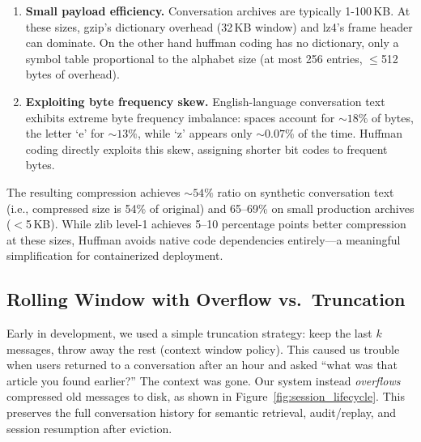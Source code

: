 \documentclass[conference]{IEEEtran}
\begin{document}
\begin{enumerate}
\item \textbf{Small payload efficiency.} Conversation archives are typically 1-100\,KB. At these sizes, gzip's dictionary overhead (32\,KB window) and lz4's frame header can dominate. On the other hand huffman coding has no dictionary, only a symbol table proportional to the alphabet size (at most 256 entries, $\leq$512 bytes of overhead).

\item \textbf{Exploiting byte frequency skew.} English-language conversation text exhibits extreme byte frequency imbalance: spaces account for ${\sim}18\%$ of bytes, the letter `e' for ${\sim}13\%$, while `z' appears only ${\sim}0.07\%$ of the time. Huffman coding directly exploits this skew, assigning shorter bit codes to frequent bytes.

\end{enumerate}

The resulting compression achieves ${\sim}54\%$ ratio on synthetic conversation text (i.e., compressed size is 54\% of original) and 65--69\% on small production archives ($<$5\,KB). While zlib level-1 achieves 5--10 percentage points better compression at these sizes, Huffman avoids native code dependencies entirely---a meaningful simplification for containerized deployment.

\subsection{Rolling Window with Overflow vs.\ Truncation}

Early in development, we used a simple truncation strategy: keep the last $k$ messages, throw away the rest (context window policy). This caused us trouble when users returned to a conversation after an hour and asked ``what was that article you found earlier?'' The context was gone. Our system instead \emph{overflows} compressed old messages to disk, as shown in Figure~\ref{fig:session_lifecycle}. This preserves the full conversation history for semantic retrieval, audit/replay, and session resumption after eviction.
\end{document}
